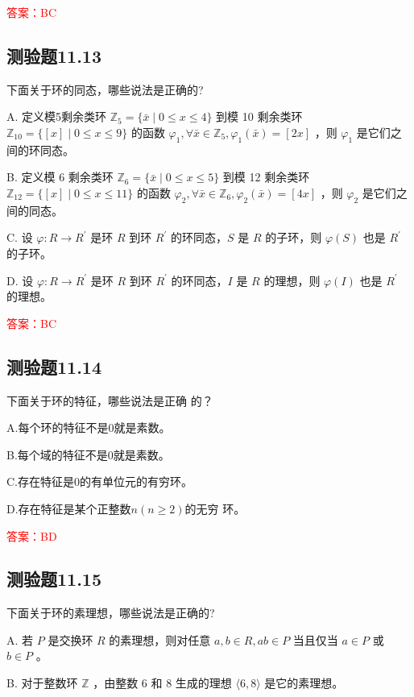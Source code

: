 \documentclass[UTF8, heading=true]{ctexart}
\begin{document}
\textcolor{red}{答案：BC}

\subsection{测验题11.13}

下面关于环的同态，哪些说法是正确的?

A.
定义模5剩余类环 $\mathbb{Z}_5=\{\bar{x} \mid 0 \leq x \leq 4\}$ 到模 10 剩余类环 $\mathbb{Z}_{10}=\{[x] \mid 0 \leq x \leq 9\}$ 的函数 $\varphi_1, \forall \bar{x} \in \mathbb{Z}_5, \varphi_1(\bar{x})=[2 x]$ ，则 $\varphi_1$ 是它们之间的环同态。

B.
定义模 6 剩余类环 $\mathbb{Z}_6=\{\bar{x} \mid 0 \leq x \leq 5\}$ 到模 12 剩余类环 $\mathbb{Z}_{12}=\{[x] \mid 0 \leq x \leq 11\}$ 的函数 $\varphi_2, \forall \bar{x} \in \mathbb{Z}_6, \varphi_2(\bar{x})=[4 x]$ ，则 $\varphi_2$ 是它们之间的同态。

C.
设 $\varphi: R \rightarrow R^{\prime}$ 是环 $R$ 到环 $R^{\prime}$ 的环同态，$S$ 是 $R$ 的子环，则 $\varphi(S)$ 也是 $R^{\prime}$ 的子环。

D.
设 $\varphi: R \rightarrow R^{\prime}$ 是环 $R$ 到环 $R^{\prime}$ 的环同态，$I$ 是 $R$ 的理想，则 $\varphi(I)$ 也是 $R^{\prime}$ 的理想。

\textcolor{red}{答案：BC}



\subsection{测验题11.14}

下面关于环的特征，哪些说法是正确
的？

A.每个环的特征不是0就是素数。

B.每个域的特征不是0就是素数。

C.存在特征是0的有单位元的有穷环。

D.存在特征是某个正整数$n(n\geq 2)$的无穷
环。

\textcolor{red}{答案：BD}

\subsection{测验题11.15}

下面关于环的素理想，哪些说法是正确的?

A.
若 $P$ 是交换环 $R$ 的素理想，则对任意 $a, b \in R, a b \in P$ 当且仅当 $a \in P$ 或 $b \in P$ 。

B.
对于整数环 $\mathbb{Z}$ ，由整数 6 和 8 生成的理想 $\langle 6,8\rangle$ 是它的素理想。
\end{document}
